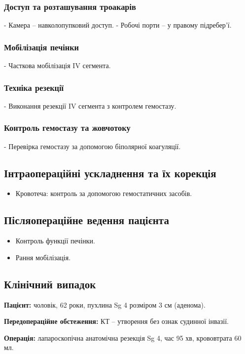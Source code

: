 \begin{refsection}
\subsubsection{Доступ та розташування троакарів}
- Камера – навколопупковий доступ.
- Робочі порти – у правому підребер'ї.

\subsubsection{Мобілізація печінки}
- Часткова мобілізація IV сегмента.

\subsubsection{Техніка резекції}
- Виконання резекції IV сегмента з контролем гемостазу.

\subsubsection{Контроль гемостазу та жовчотоку}
- Перевірка гемостазу за допомогою біполярної коагуляції.

\subsection{Інтраопераційні ускладнення та їх корекція}
\begin{itemize}
    \item Кровотеча: контроль за допомогою гемостатичних засобів.
\end{itemize}

\subsection{Післяопераційне ведення пацієнта}
\begin{itemize}
    \item Контроль функції печінки.
    \item Рання мобілізація.
\end{itemize}

\subsection{Клінічний випадок}
\textbf{Пацієнт:} чоловік, 62 роки, пухлина Sg 4 розміром 3 см (аденома).

\textbf{Передопераційне обстеження:} КТ – утворення без ознак судинної інвазії.

\textbf{Операція:} лапароскопічна анатомічна резекція Sg 4, час 95 хв, крововтрата 60 мл.


\end{refsection}
